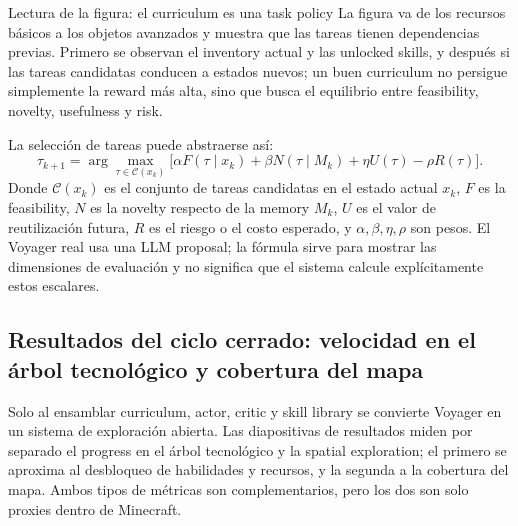 
\begin{knowledgebox}{Lectura de la figura: el curriculum es una task policy}
La figura va de los recursos básicos a los objetos avanzados y muestra que las tareas tienen dependencias previas. Primero se observan el inventory actual y las unlocked skills, y después si las tareas candidatas conducen a estados nuevos; un buen curriculum no persigue simplemente la reward más alta, sino que busca el equilibrio entre feasibility, novelty, usefulness y risk.
\end{knowledgebox}


La selección de tareas puede abstraerse así:
\[
\tau_{k+1}=\arg\max_{\tau\in\mathcal{C}(x_k)}
\bigl[\alpha F(\tau\mid x_k)+\beta N(\tau\mid M_k)+\eta U(\tau)-\rho R(\tau)\bigr].
\]
Donde $\mathcal{C}(x_k)$ es el conjunto de tareas candidatas en el estado actual $x_k$, $F$ es la feasibility, $N$ es la novelty respecto de la memory $M_k$, $U$ es el valor de reutilización futura, $R$ es el riesgo o el costo esperado, y $\alpha,\beta,\eta,\rho$ son pesos. El Voyager real usa una LLM proposal; la fórmula sirve para mostrar las dimensiones de evaluación y no significa que el sistema calcule explícitamente estos escalares.

\subsection{Resultados del ciclo cerrado: velocidad en el árbol tecnológico y cobertura del mapa}

Solo al ensamblar curriculum, actor, critic y skill library se convierte Voyager en un sistema de exploración abierta. Las diapositivas de resultados miden por separado el progress en el árbol tecnológico y la spatial exploration; el primero se aproxima al desbloqueo de habilidades y recursos, y la segunda a la cobertura del mapa. Ambos tipos de métricas son complementarios, pero los dos son solo proxies dentro de Minecraft.


